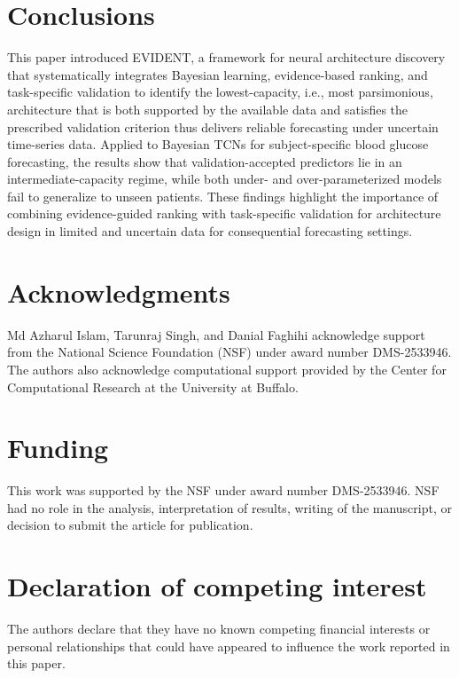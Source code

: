 \documentclass[preprint,12pt]{elsarticle}
\begin{document}
\section{Conclusions}\label{sec:conclusions}
This paper introduced EVIDENT, a framework for neural architecture discovery that systematically integrates Bayesian learning, evidence-based ranking, and task-specific validation to identify the lowest-capacity, i.e., most parsimonious,  architecture that is both supported by the available data and satisfies the prescribed validation criterion thus delivers reliable forecasting under uncertain time-series data. 
%
Applied to Bayesian TCNs for subject-specific blood glucose forecasting, the results show that validation-accepted predictors lie in an intermediate-capacity regime, while both under- and over-parameterized models fail to generalize to unseen patients. 
These findings highlight the importance of combining evidence-guided ranking with task-specific validation for architecture design in limited and uncertain data for consequential forecasting settings.




\section*{Acknowledgments}
Md Azharul Islam, Tarunraj Singh, and Danial Faghihi acknowledge support from the National Science Foundation (NSF) under award number DMS-2533946. The authors also acknowledge computational support provided by the Center for Computational Research at the University at Buffalo.

\section*{Funding}
This work was supported by the NSF under award number DMS-2533946. NSF had no role in the analysis, interpretation of results, writing of the manuscript, or decision to submit the article for publication.

\section*{Declaration of competing interest}
The authors declare that they have no known competing financial interests or personal relationships that could have appeared to influence the work reported in this paper.
\end{document}
